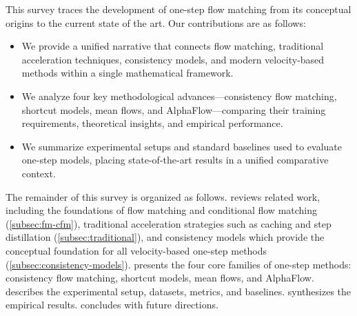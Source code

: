 This survey traces the development of one-step flow matching from its conceptual origins to the current state of the art. Our contributions are as follows:

\begin{itemize}
    \item We provide a unified narrative that connects flow matching, traditional acceleration techniques, consistency models, and modern velocity-based methods within a single mathematical framework.
    \item We analyze four key methodological advances---consistency flow matching, shortcut models, mean flows, and AlphaFlow---comparing their training requirements, theoretical insights, and empirical performance.
    \item We summarize experimental setups and standard baselines used to evaluate one-step models, placing state-of-the-art results in a unified comparative context.
\end{itemize}

The remainder of this survey is organized as follows.  reviews related work, including the foundations of flow matching and conditional flow matching (\cref{subsec:fm-cfm}), traditional acceleration strategies such as caching and step distillation (\cref{subsec:traditional}), and consistency models which provide the conceptual foundation for all velocity-based one-step methods (\cref{subsec:consistency-models}).  presents the four core families of one-step methods: consistency flow matching, shortcut models, mean flows, and AlphaFlow.  describes the experimental setup, datasets, metrics, and baselines.  synthesizes the empirical results.  concludes with future directions.
